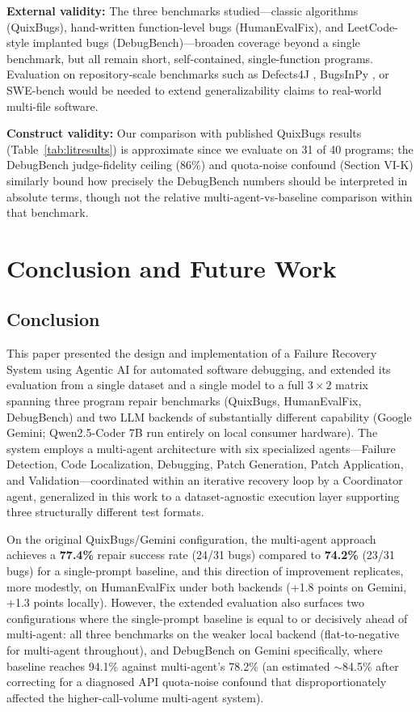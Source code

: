 \documentclass[conference]{IEEEtran}
\begin{document}
\textbf{External validity:} The three benchmarks studied---classic algorithms (QuixBugs), hand-written function-level bugs (HumanEvalFix), and LeetCode-style implanted bugs (DebugBench)---broaden coverage beyond a single benchmark, but all remain short, self-contained, single-function programs. Evaluation on repository-scale benchmarks such as Defects4J \cite{defects4j}, BugsInPy \cite{bugsinpy}, or SWE-bench \cite{swebench} would be needed to extend generalizability claims to real-world multi-file software.

\textbf{Construct validity:} Our comparison with published QuixBugs results (Table~\ref{tab:litresults}) is approximate since we evaluate on 31 of 40 programs; the DebugBench judge-fidelity ceiling (86\%) and quota-noise confound (Section VI-K) similarly bound how precisely the DebugBench numbers should be interpreted in absolute terms, though not the relative multi-agent-vs-baseline comparison within that benchmark.

\section{Conclusion and Future Work}

\subsection{Conclusion}
This paper presented the design and implementation of a Failure Recovery System using Agentic AI for automated software debugging, and extended its evaluation from a single dataset and a single model to a full $3 \times 2$ matrix spanning three program repair benchmarks (QuixBugs, HumanEvalFix, DebugBench) and two LLM backends of substantially different capability (Google Gemini; Qwen2.5-Coder 7B run entirely on local consumer hardware). The system employs a multi-agent architecture with six specialized agents---Failure Detection, Code Localization, Debugging, Patch Generation, Patch Application, and Validation---coordinated within an iterative recovery loop by a Coordinator agent, generalized in this work to a dataset-agnostic execution layer supporting three structurally different test formats.

On the original QuixBugs/Gemini configuration, the multi-agent approach achieves a \textbf{77.4\%} repair success rate (24/31 bugs) compared to \textbf{74.2\%} (23/31 bugs) for a single-prompt baseline, and this direction of improvement replicates, more modestly, on HumanEvalFix under both backends (+1.8 points on Gemini, +1.3 points locally). However, the extended evaluation also surfaces two configurations where the single-prompt baseline is equal to or decisively ahead of multi-agent: all three benchmarks on the weaker local backend (flat-to-negative for multi-agent throughout), and DebugBench on Gemini specifically, where baseline reaches 94.1\% against multi-agent's 78.2\% (an estimated $\sim$84.5\% after correcting for a diagnosed API quota-noise confound that disproportionately affected the higher-call-volume multi-agent system).
\end{document}
